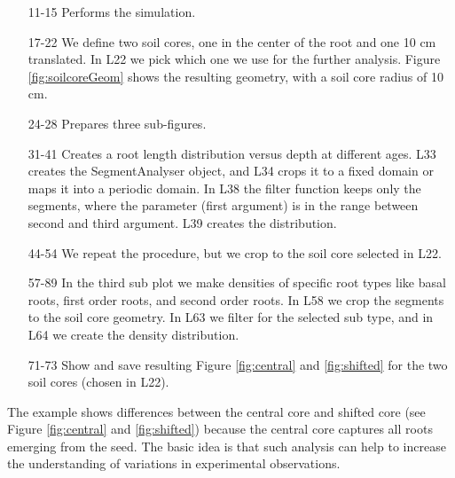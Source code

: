

\begin{itemize}
\item[11-15] Performs the simulation.
\item[17-22] We define two soil cores, one in the center of the root and one 10 cm translated. In L22 we pick which one we use for the further analysis. Figure \ref{fig:soilcoreGeom} shows the resulting geometry, with a soil core radius of 10 cm.
\item[24-28] Prepares three sub-figures. 
\item[31-41] Creates a root length distribution versus depth at different ages. L33 creates the SegmentAnalyser object, and L34 crops it to a fixed domain or maps it into a periodic domain. In L38 the filter function keeps only the segments, where the parameter (first argument) is in the range between second and third argument. L39 creates the distribution. 
\item[44-54] We repeat the procedure, but we crop to the soil core selected in L22. 
\item[57-89] In the third sub plot we make densities of specific root types like basal roots, first order roots, and second order roots. In L58 we crop the segments to the soil core geometry. In L63 we filter for the selected sub type, and in L64 we create the density distribution.
\item[71-73] Show and save resulting Figure \ref{fig:central} and \ref{fig:shifted} for the two soil cores (chosen in L22).
\end{itemize}



The example shows differences between the central core and shifted core (see Figure \ref{fig:central} and \ref{fig:shifted}) because the central core captures all roots emerging from the seed. The basic idea is that such analysis can help to increase the understanding of variations in experimental observations.
% 
% 


